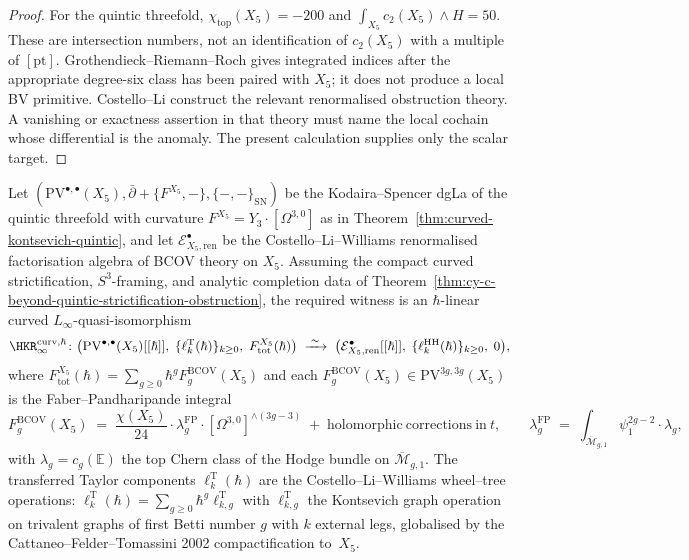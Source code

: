 \begin{proof}
For the quintic threefold,
\(\chi_{\mathrm{top}}(X_5)=-200\) and
\(\int_{X_5}c_2(X_5)\wedge H=50\). These are intersection numbers, not
an identification of \(c_2(X_5)\) with a multiple of \([\mathrm{pt}]\).
Grothendieck--Riemann--Roch gives integrated indices after the
appropriate degree-six class has been paired with \(X_5\); it does not
produce a local BV primitive. Costello--Li construct the relevant
renormalised obstruction theory. A vanishing or exactness assertion in
that theory must name the local cochain whose differential is the
anomaly. The present calculation supplies only the scalar target.
\end{proof}

\begin{theorem}
\label{thm:all-genera-bcov-transfer-quintic}
Let $(\mathrm{PV}^{\bullet,\bullet}(X_5), \bar\partial + \{F^{X_5}, -\}, \{-,-\}_{\mathrm{SN}})$ be the Kodaira--Spencer dgLa of the quintic threefold with curvature $F^{X_5} = Y_3 \cdot [\Omega^{3,0}]$ as in Theorem~\ref{thm:curved-kontsevich-quintic}, and let $\mathcal{E}^\bullet_{X_5, \mathrm{ren}}$ be the Costello--Li--Williams renormalised factorisation algebra of BCOV theory on $X_5$. Assuming the compact curved strictification, $S^3$-framing, and analytic completion data of Theorem~\ref{thm:cy-c-beyond-quintic-strictification-obstruction}, the required witness is an $\hbar$-linear curved $L_\infty$-quasi-isomorphism
\[
 \HKR_\infty^{\mathrm{curv}, \hbar}
 \colon
 \bigl(\mathrm{PV}^{\bullet,\bullet}(X_5)[[\hbar]],\; \{\ell_k^{\mathrm{T}}(\hbar)\}_{k \geq 0},\; F_{\mathrm{tot}}^{X_5}(\hbar)\bigr)
 \;\xrightarrow{\;\sim\;}\;
 \bigl(\mathcal{E}^\bullet_{X_5, \mathrm{ren}}[[\hbar]],\; \{\ell_k^{\mathrm{HH}}(\hbar)\}_{k \geq 0},\; 0\bigr),
\]
where $F_{\mathrm{tot}}^{X_5}(\hbar) = \sum_{g \geq 0} \hbar^g F_g^{\mathrm{BCOV}}(X_5)$ and each $F_g^{\mathrm{BCOV}}(X_5) \in \mathrm{PV}^{3g, 3g}(X_5)$ is the Faber--Pandharipande integral
\[
 F_g^{\mathrm{BCOV}}(X_5) \;=\; \frac{\chi(X_5)}{24}\cdot \lambda_g^{\mathrm{FP}}\cdot [\Omega^{3,0}]^{\wedge (3g-3)}
 \;+\; \mathrm{holomorphic\ corrections\ in\ }t,
 \qquad
 \lambda_g^{\mathrm{FP}} \;=\; \int_{\overline{\mathcal{M}}_{g, 1}} \psi_1^{2g-2} \cdot \lambda_g,
\]
with $\lambda_g = c_g(\mathbb{E})$ the top Chern class of the Hodge bundle on $\overline{\mathcal{M}}_{g, 1}$. The transferred Taylor components $\ell_k^{\mathrm{T}}(\hbar)$ are the Costello--Li--Williams wheel--tree operations: $\ell_k^{\mathrm{T}}(\hbar) = \sum_{g \geq 0} \hbar^g \ell_{k, g}^{\mathrm{T}}$ with $\ell_{k, g}^{\mathrm{T}}$ the Kontsevich graph operation on trivalent graphs of first Betti number $g$ with $k$ external legs, globalised by the Cattaneo--Felder--Tomassini 2002 compactification to~$X_5$.
\end{theorem}

